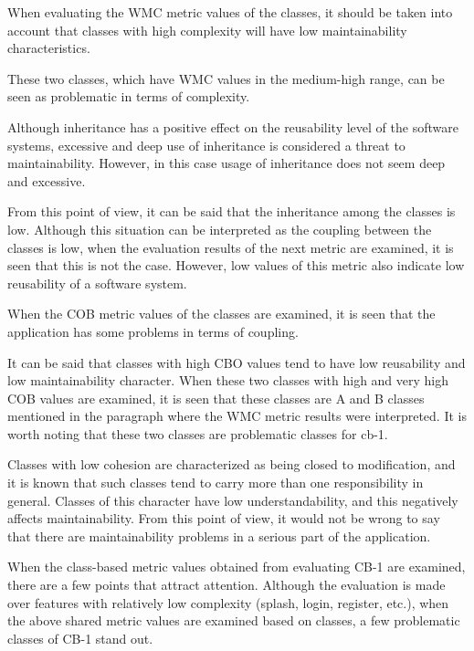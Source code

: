 When evaluating the WMC metric values of the classes, it should be taken into account that classes with high complexity will have low maintainability characteristics.

These two classes, which have WMC values in the medium-high range, can be seen as problematic in terms of complexity.

Although inheritance has a positive effect on the reusability level of the software systems, excessive and deep use of inheritance is considered a threat to maintainability. However, in this case usage of inheritance does not seem deep and excessive.

From this point of view, it can be said that the inheritance among the classes is low. Although this situation can be interpreted as the coupling between the classes is low, when the evaluation results of the next metric are examined, it is seen that this is not the case. However, low values of this metric also indicate low reusability of a software system.

When the COB metric values of the classes are examined, it is seen that the application has some problems in terms of coupling.

It can be said that classes with high CBO values tend to have low reusability and low maintainability character. When these two classes with high and very high COB values are examined, it is seen that these classes are A and B classes mentioned in the paragraph where the WMC metric results were interpreted. It is worth noting that these two classes are problematic classes for cb-1.

Classes with low cohesion are characterized as being closed to modification, and it is known that such classes tend to carry more than one responsibility in general. Classes of this character have low understandability, and this negatively affects maintainability. From this point of view, it would not be wrong to say that there are maintainability problems in a serious part of the application.

When the class-based metric values obtained from evaluating CB-1 are examined, there are a few points that attract attention. Although the evaluation is made over features with relatively low complexity (splash, login, register, etc.), when the above shared metric values are examined based on classes, a few problematic classes of CB-1 stand out.

